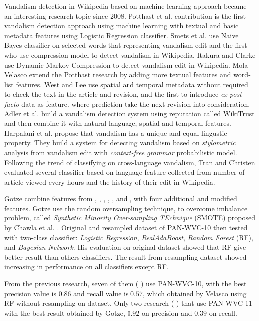 Vandalism detection in Wikipedia based on machine learning approach
became an interesting research topic since 2008.
Potthast et al. \cite{potthast2008automatic} contribution is the first vandalism
detection approach using machine learning with textual and basic
metadata features using Logistic Regression classifier.
Smets et al. \cite{smets08automaticvandalism} use Naive Bayes classifier on
selected words that representing vandalism edit and the first who use
compression model to detect vandalism in Wikipedia.
Itakura and Clarke \cite{itakura2009using} use Dynamic Markov Compression to
detect vandalism edit in Wikipedia.
Mola Velasco \cite{mola2012wikipedia} extend the Potthast research by adding
more textual features and word-list features.
West and Lee \cite{west2011multilingual} use spatial and temporal metadata
without required to check the text in the article and revision, and the first
to introduce \textit{ex post facto} data as feature, where prediction
take the next revision into consideration.
Adler et al. \cite{adler2011wikipedia} build a vandalism detection system using
reputation called WikiTrust and then combine it with
natural language, spatial and temporal features.
Harpalani et al. \cite{harpalani2011language} propose that vandalism has
a unique and equal lingustic property.
They build a system for detecting vandalism based on \textit{stylometric}
analysis from vandalism edit with \textit{context-free grammar} probabilistic
model.
Following the trend of classifying on cross-language vandalism, Tran and
Christen \cite{tran2013cross} evaluated several classifier based on
language feature collected from number of article viewed every hours and the
history of their edit in Wikipedia.

Gotze \cite{gotze2014advanced} combine features from
\cite{potthast2008automatic},
\cite{mola2012wikipedia},
\cite{west2011multilingual},
\cite{adler2011wikipedia},
\cite{javanmardi2011vandalism},
and
\cite{wang2010got},
with four additional and modified features.
Gotze use the random oversampling technique, to overcome imbalance problem,
called
\textit{Synthetic Minority Over-sampling TEchnique} (SMOTE)
proposed by Chawla et al.
\cite{chawla2002smote}.
Original and resampled dataset of PAN-WVC-10 then tested with two-class
classifier:
\textit{Logistic Regression},
\textit{RealAdaBoost},
\textit{Random Forest} (RF), and
\textit{Bayesian Network}.
His evaluation on original dataset showed that RF give better result than
others classifiers.
The result from resampling dataset showed increasing in performance on all
classifiers except RF.

From the previous research, seven of them
(
\cite{mola2012wikipedia}
\cite{west2011multilingual}
\cite{adler2011wikipedia}
\cite{harpalani2011language}
\cite{gotze2014advanced}
\cite{wang2010got}
\cite{adler2010detecting}
)
use PAN-WVC-10,
with the best precision value is $0.86$ and recall value is $0.57$, which
obtained by Velasco using RF without resampling on dataset.
Only two research
(
\cite{west2011multilingual}
\cite{gotze2014advanced}
)
that use PAN-WVC-11
with the best result obtained by Gotze, $0.92$ on precision and $0.39$
on recall.
